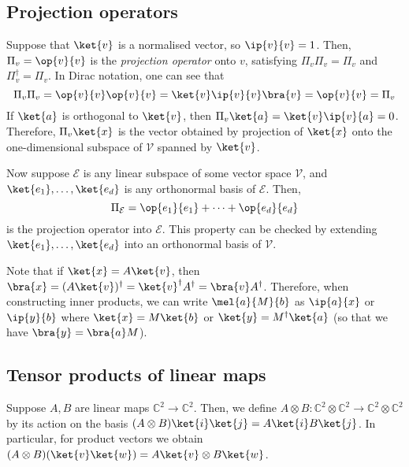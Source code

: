 \subsection{Projection operators}
Suppose that \( \ket{v} \) is a normalised vector, so \( \ip{v}{v} = 1 \).
Then, \( \Pi_v = \op{v}{v} \) is the \emph{projection operator} onto \( v \), satisfying \( \Pi_v \Pi_v = \Pi_v \) and \( \Pi_v^\dagger = \Pi_v \).
In Dirac notation, one can see that
\[ \Pi_v \Pi_v = \op{v}{v} \op{v}{v} = \ket{v} \ip{v}{v} \bra{v} = \op{v}{v} = \Pi_v \]
If \( \ket{a} \) is orthogonal to \( \ket{v} \), then \( \Pi_v \ket{a} = \ket{v} \ip{v}{a} = 0 \).
Therefore, \( \Pi_v \ket{x} \) is the vector obtained by projection of \( \ket{x} \) onto the one-dimensional subspace of \( \mathcal V \) spanned by \( \ket{v} \).

Now suppose \( \mathcal E \) is any linear subspace of some vector space \( \mathcal V \), and \( \ket{e_1}, \dots, \ket{e_d} \) is any orthonormal basis of \( \mathcal E \).
Then,
\[ \Pi_{\mathcal E} = \op{e_1}{e_1} + \dots + \op{e_d}{e_d} \]
is the projection operator into \( \mathcal E \).
This property can be checked by extending \( \ket{e_1}, \dots, \ket{e_d} \) into an orthonormal basis of \( \mathcal V \).

Note that if \( \ket{x} = A \ket{v} \), then \( \bra{x} = (A \ket{v})^\dagger = \ket{v}^\dagger A^\dagger = \bra{v} A^\dagger \).
Therefore, when constructing inner products, we can write \( \mel{a}{M}{b} \) as \( \ip{a}{x} \) or \( \ip{y}{b} \) where \( \ket{x} = M \ket{b} \) or \( \ket{y} = M^\dagger \ket{a} \) (so that we have \( \bra{y} = \bra{a} M \)).

\subsection{Tensor products of linear maps}
Suppose \( A, B \) are linear maps \( \mathbb C^2 \to \mathbb C^2 \).
Then, we define \( A \otimes B \colon \mathbb C^2 \otimes \mathbb C^2 \to \mathbb C^2 \otimes \mathbb C^2 \) by its action on the basis \( (A \otimes B)\ket{i} \ket{j} = A \ket{i} B \ket{j} \).
In particular, for product vectors we obtain \( (A \otimes B) (\ket{v} \ket{w}) = A \ket{v} \otimes B \ket{w} \).

